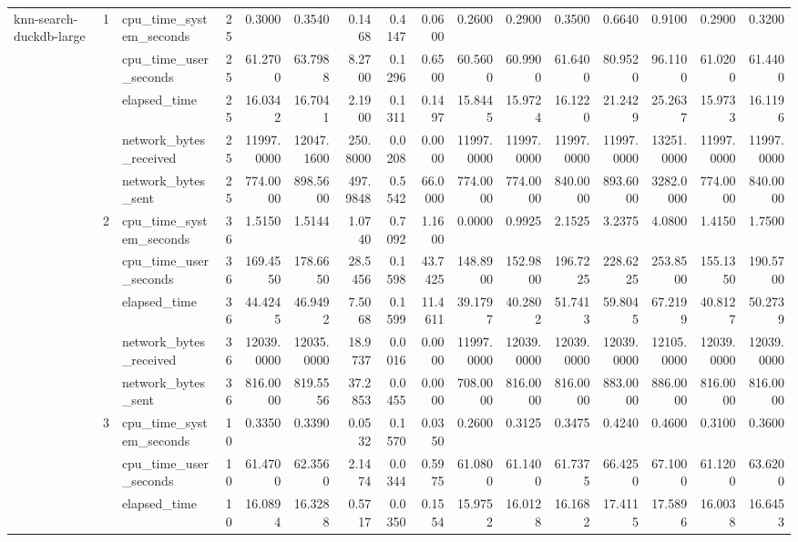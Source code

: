 \begin{tabular}{lllrrrrrrrrrrrrr}
\multirow[t]{15}{*}{knn-search-duckdb-large} & \multirow[t]{5}{*}{1} & cpu\_time\_system\_seconds & 25 & 0.3000 & 0.3540 & 0.1468 & 0.4147 & 0.0600 & 0.2600 & 0.2900 & 0.3500 & 0.6640 & 0.9100 & 0.2900 & 0.3200 \\
 &  & cpu\_time\_user\_seconds & 25 & 61.2700 & 63.7988 & 8.2700 & 0.1296 & 0.6500 & 60.5600 & 60.9900 & 61.6400 & 80.9520 & 96.1100 & 61.0200 & 61.4400 \\
 &  & elapsed\_time & 25 & 16.0342 & 16.7041 & 2.1900 & 0.1311 & 0.1497 & 15.8445 & 15.9724 & 16.1220 & 21.2429 & 25.2637 & 15.9733 & 16.1196 \\
 &  & network\_bytes\_received & 25 & 11997.0000 & 12047.1600 & 250.8000 & 0.0208 & 0.0000 & 11997.0000 & 11997.0000 & 11997.0000 & 11997.0000 & 13251.0000 & 11997.0000 & 11997.0000 \\
 &  & network\_bytes\_sent & 25 & 774.0000 & 898.5600 & 497.9848 & 0.5542 & 66.0000 & 774.0000 & 774.0000 & 840.0000 & 893.6000 & 3282.0000 & 774.0000 & 840.0000 \\
\cline{2-16}
 & \multirow[t]{5}{*}{2} & cpu\_time\_system\_seconds & 36 & 1.5150 & 1.5144 & 1.0740 & 0.7092 & 1.1600 & 0.0000 & 0.9925 & 2.1525 & 3.2375 & 4.0800 & 1.4150 & 1.7500 \\
 &  & cpu\_time\_user\_seconds & 36 & 169.4550 & 178.6650 & 28.5456 & 0.1598 & 43.7425 & 148.8900 & 152.9800 & 196.7225 & 228.6225 & 253.8500 & 155.1350 & 190.5700 \\
 &  & elapsed\_time & 36 & 44.4245 & 46.9492 & 7.5068 & 0.1599 & 11.4611 & 39.1797 & 40.2802 & 51.7413 & 59.8045 & 67.2199 & 40.8127 & 50.2739 \\
 &  & network\_bytes\_received & 36 & 12039.0000 & 12035.0000 & 18.9737 & 0.0016 & 0.0000 & 11997.0000 & 12039.0000 & 12039.0000 & 12039.0000 & 12105.0000 & 12039.0000 & 12039.0000 \\
 &  & network\_bytes\_sent & 36 & 816.0000 & 819.5556 & 37.2853 & 0.0455 & 0.0000 & 708.0000 & 816.0000 & 816.0000 & 883.0000 & 886.0000 & 816.0000 & 816.0000 \\
\cline{2-16}
 & \multirow[t]{5}{*}{3} & cpu\_time\_system\_seconds & 10 & 0.3350 & 0.3390 & 0.0532 & 0.1570 & 0.0350 & 0.2600 & 0.3125 & 0.3475 & 0.4240 & 0.4600 & 0.3100 & 0.3600 \\
 &  & cpu\_time\_user\_seconds & 10 & 61.4700 & 62.3560 & 2.1474 & 0.0344 & 0.5975 & 61.0800 & 61.1400 & 61.7375 & 66.4250 & 67.1000 & 61.1200 & 63.6200 \\
 &  & elapsed\_time & 10 & 16.0894 & 16.3288 & 0.5717 & 0.0350 & 0.1554 & 15.9752 & 16.0128 & 16.1682 & 17.4115 & 17.5896 & 16.0038 & 16.6453 \\

\end{tabular}
